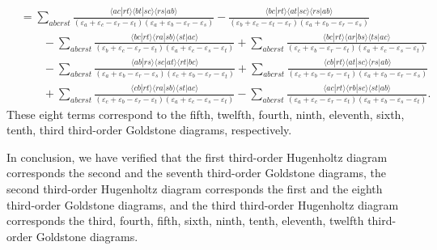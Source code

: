 \documentclass[a4paper]{book}
\newcounter{solution}[chapter]
\begin{document}
\begin{solution}
\begin{align*}
		&= \sum_{abcrst} \frac{ \langle ac | rt \rangle \langle bt | sc \rangle \langle rs | ab \rangle }{ ( \varepsilon_a + \varepsilon_c - \varepsilon_r - \varepsilon_t ) ( \varepsilon_a + \varepsilon_b - \varepsilon_r - \varepsilon_s ) } - \frac{ \langle bc | rt \rangle \langle at | sc \rangle \langle rs | ab \rangle }{ ( \varepsilon_b + \varepsilon_c - \varepsilon_t - \varepsilon_r ) ( \varepsilon_a + \varepsilon_b - \varepsilon_r - \varepsilon_s ) } \\
		&\hspace{2em} - \sum_{abcrst} \frac{ \langle bc | rt \rangle \langle ra | sb \rangle \langle st | ac \rangle }{ ( \varepsilon_b + \varepsilon_c - \varepsilon_r - \varepsilon_t ) ( \varepsilon_a + \varepsilon_c - \varepsilon_s - \varepsilon_t ) } + \sum_{abcrst} \frac{ \langle bc | rt \rangle \langle ar | bs \rangle \langle ts | ac \rangle }{ ( \varepsilon_c + \varepsilon_b - \varepsilon_r - \varepsilon_t ) ( \varepsilon_a + \varepsilon_c - \varepsilon_s - \varepsilon_t ) } \\
		&\hspace{2em} - \sum_{abcrst} \frac{ \langle ab | rs \rangle \langle sc | at \rangle \langle rt | bc \rangle }{ ( \varepsilon_a + \varepsilon_b - \varepsilon_r - \varepsilon_s ) ( \varepsilon_c + \varepsilon_b - \varepsilon_r - \varepsilon_t ) } + \sum_{abcrst} \frac{ \langle cb | rt \rangle \langle at | sc \rangle \langle rs | ab \rangle }{ ( \varepsilon_c + \varepsilon_b - \varepsilon_r - \varepsilon_t ) ( \varepsilon_a + \varepsilon_b - \varepsilon_r - \varepsilon_s ) } \\
		&\hspace{2em} + \sum_{abcrst} \frac{ \langle cb | rt \rangle \langle ra | sb \rangle \langle st | ac \rangle }{ ( \varepsilon_c + \varepsilon_b - \varepsilon_r - \varepsilon_t ) ( \varepsilon_a + \varepsilon_c - \varepsilon_s - \varepsilon_t ) } - \sum_{abcrst} \frac{ \langle ac | rt \rangle \langle rb | sc \rangle \langle st | ab \rangle }{ ( \varepsilon_a + \varepsilon_c - \varepsilon_r - \varepsilon_t ) ( \varepsilon_a + \varepsilon_b - \varepsilon_s - \varepsilon_t ) }.
	\end{align*}	
	These eight terms correspond to the fifth, twelfth, fourth, ninth, eleventh, sixth, tenth, third third-order Goldstone diagrams, respectively.
	
	In conclusion, we have verified that the first third-order Hugenholtz diagram corresponds the second and the seventh third-order Goldstone diagrams, the second third-order Hugenholtz diagram corresponds the first and the eighth third-order Goldstone diagrams, and the third third-order Hugenholtz diagram corresponds the third, fourth, fifth, sixth, ninth, tenth, eleventh, twelfth third-order Goldstone diagrams.
	\end{solution}
	
\end{document}
